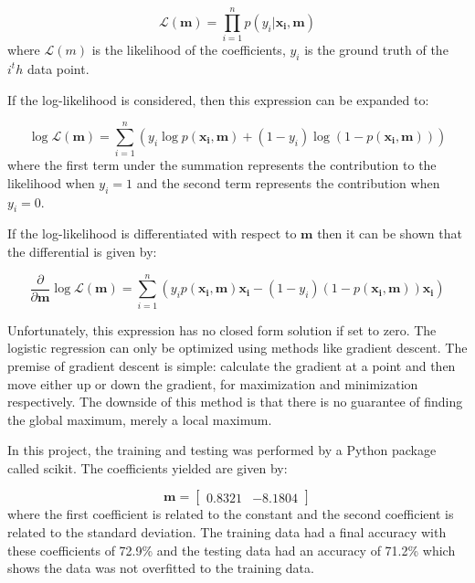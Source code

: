                 \begin{equation}
                    \mathcal{L}(\mathbf{m}) = \prod_{i=1}^n p(y_i|\mathbf{x_i}, \mathbf{m})
                \end{equation}
                where $\mathcal{L}(m)$ is the likelihood of the coefficients, $y_i$ is the ground truth of the $i^th$ data point.

                If the log-likelihood is considered, then this expression can be expanded to:

                \begin{equation}
                    \log{\mathcal{L}(\mathbf{m})} = \sum_{i=1}^n (y_i\log{p(\mathbf{x_i}, \mathbf{m})} + (1-y_i)\log{(1 - p(\mathbf{x_i}, \mathbf{m}))})
                \end{equation}
                where the first term under the summation represents the contribution to the likelihood when $y_i = 1$ and the second term represents the contribution when $y_i = 0$.

                If the log-likelihood is differentiated with respect to $\mathbf{m}$ then it can be shown that the differential is given by:

                \begin{equation}
                    \frac{\partial}{\partial \mathbf{m}}\log{\mathcal{L}(\mathbf{m})} = \sum_{i=1}^n (y_ip(\mathbf{x_i}, \mathbf{m})\mathbf{x_i} - (1-y_i)(1 -p(\mathbf{x_i},\mathbf{m}))\mathbf{x_i})
                \end{equation}

                Unfortunately, this expression has no closed form solution if set to zero. The logistic regression can only be optimized using methods like gradient descent. The premise of gradient descent is simple: calculate the gradient at a point and then move either up or down the gradient, for maximization and minimization respectively. The downside of this method is that there is no guarantee of finding the global maximum, merely a local maximum. 

                In this project, the training and testing was performed by a Python package called scikit. The coefficients yielded are given by:

                \begin{equation}
                    \mathbf{m} = \begin{bmatrix} 0.8321 & -8.1804 \end{bmatrix}
                \end{equation}
                where the first coefficient is related to the constant and the second coefficient is related to the standard deviation. The training data had a final accuracy with these coefficients of 72.9\% and the testing data had an accuracy of 71.2\% which shows the data was not overfitted to the training data.

